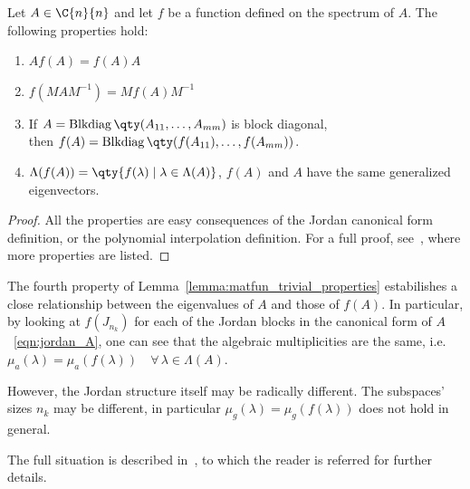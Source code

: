 \begin{lemma}\label{lemma:matfun_trivial_properties}
	Let $A\in\C{n}{n}$ and let $f$ be a function defined on the spectrum of $A$. The following properties hold:
	\begin{enumerate}
		\item $Af(A)=f(A)A$
		\item $f(MAM^{-1})=	Mf(A)M^{-1}$
		\item If $A=\operatorname{Blkdiag}\qty(A_{11},\dots,A_{mm})$ is block diagonal, \\
			  then $f(A)=\operatorname{Blkdiag}\qty(f(A_{11}),\dots,f(A_{mm}))$.
		\item $\Lambda(f(A))=\qty{f(\lambda)\mid\lambda\in\Lambda(A)}$, $f(A)$ and $A$ have the same generalized eigenvectors.
	\end{enumerate}
\end{lemma}
\begin{proof}
	All the properties are easy consequences of the Jordan canonical form definition, or the polynomial interpolation definition. For a full proof, see~\cite[Thm.~1.13]{higham:matfun_book}, where more properties are listed.
\end{proof}

\begin{oss*}
	The fourth property of Lemma~\ref{lemma:matfun_trivial_properties} estabilishes a close relationship between the eigenvalues of $A$ and those of $f(A)$. In particular, by looking at $f(J_{n_k})$ for each of the Jordan blocks in the canonical form of $A$~\eqref{eqn:jordan_A}, one can see that the algebraic multiplicities are the same, i.e. $\mu_a(\lambda)=\mu_a(f(\lambda))\quad\forall\,\lambda\in\Lambda(A)$.
	
	However, the Jordan structure itself may be radically different. The subspaces' sizes $n_k$ may be different, in particular $\mu_g(\lambda)=\mu_g(f(\lambda))$ does not hold in general.
	
	The full situation is described in~\cite[Thm.~1.36]{higham:matfun_book}, to which the reader is referred for further details.
\end{oss*}


